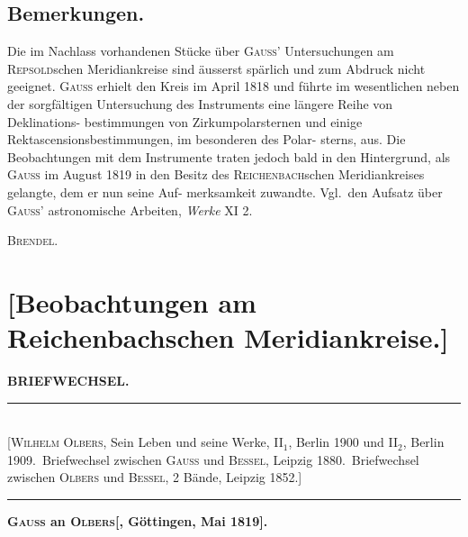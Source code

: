 \documentclass[12pt,a4paper]{article}
\theoremstyle{plain}
\theoremstyle{definition}
\theoremstyle{remark}
\begin{document}
\medskip
\subsection*{Bemerkungen.}
Die im Nachlass vorhandenen St\"{u}cke \"{u}ber \textsc{Gauss}' Untersuchungen am \textsc{Repsold}schen Meridiankreise
sind \"{a}usserst sp\"{a}rlich und zum Abdruck nicht geeignet. \textsc{Gauss} erhielt den Kreis im April 1818 und f\"{u}hrte
im wesentlichen neben der sorgf\"{a}ltigen Untersuchung des Instruments eine l\"{a}ngere Reihe von Deklinations-
bestimmungen von Zirkumpolarsternen und einige Rektascensionsbestimmungen, im besonderen des Polar-
sterns, aus. Die Beobachtungen mit dem Instrumente traten jedoch bald in den Hintergrund, als \textsc{Gauss}
im August 1819 in den Besitz des \textsc{Reichenbach}schen Meridiankreises gelangte, dem er nun seine Auf-
merksamkeit zuwandte. Vgl.\ den Aufsatz \"{u}ber \textsc{Gauss}' astronomische Arbeiten, \textit{Werke} XI 2.

\begin{flushright}
\textsc{Brendel}.
\end{flushright}

\newpage
\section*{[Beobachtungen am Reichenbachschen Meridiankreise.]}

\begin{center}
\Large\textbf{BRIEFWECHSEL.}
\end{center}

\begin{center}
\rule{0.8\textwidth}{0.4pt}\\[0.3em]
{\small [\textsc{Wilhelm Olbers}, Sein Leben und seine Werke, II$_1$, Berlin 1900 und II$_2$, Berlin 1909.\ Briefwechsel
zwischen \textsc{Gauss} und \textsc{Bessel}, Leipzig 1880.\ Briefwechsel zwischen \textsc{Olbers} und \textsc{Bessel}, 2 B\"{a}nde,
Leipzig 1852.]}\\[0.3em]
\rule{0.8\textwidth}{0.4pt}
\end{center}

\medskip
\textbf{\textsc{Gauss} an \textsc{Olbers}[, G\"{o}ttingen, Mai 1819].}
\end{document}
